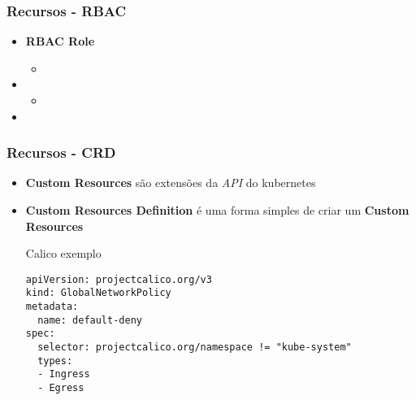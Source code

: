 \begin{frame}
\frametitle{Recursos - RBAC}
\begin{itemize}
	\item \textbf{RBAC Role}
		\begin{itemize}
			\item {}
		\end{itemize}
	\item {}
		\begin{itemize}
			\item {}
		\end{itemize}
	\item {}
\end{itemize}
\end{frame}

\begin{frame}[containsverbatim]
\frametitle{Recursos - CRD}
\begin{itemize}
	\item \textbf{Custom Resources} são extensões da \textit{API} do kubernetes
	\item \textbf{Custom Resources Definition} é uma forma simples de criar um \textbf{Custom Resources}
\begin{center}
\begin{minipage}{0.9\textwidth}
\begin{block}{Calico exemplo}
\scriptsize
\begin{lstlisting}
apiVersion: projectcalico.org/v3
kind: GlobalNetworkPolicy
metadata:
  name: default-deny
spec:
  selector: projectcalico.org/namespace != "kube-system"
  types:
  - Ingress
  - Egress
\end{lstlisting}
\end{block}
\end{minipage}
\end{center}
\end{itemize}
\end{frame}
